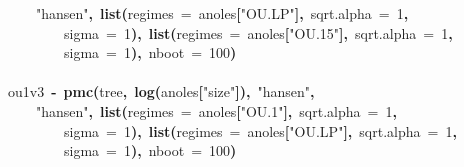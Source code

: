 \documentclass{elsarticle}
\makeatletter
\newcommand{\hlnumber}[1]{\textcolor[rgb]{0,0,0}{#1}}%
\newcommand{\hlfunctioncall}[1]{\textcolor[rgb]{.5,0,.33}{\textbf{#1}}}%
\newcommand{\hlstring}[1]{\textcolor[rgb]{.6,.6,1}{#1}}%
\newcommand{\hlkeyword}[1]{\textbf{#1}}%
\newcommand{\hlargument}[1]{\textcolor[rgb]{.69,.25,.02}{#1}}%
\newcommand{\hlassignement}[1]{\textbf{#1}}%
\newcommand{\hlsymbol}[1]{#1}%
\newcommand{\hlstd}[1]{\textcolor[rgb]{0,0,0}{#1}}%
\newenvironment{kframe}{%
 \def\FrameCommand##1{\hskip\@totalleftmargin \hskip-\fboxsep
 \colorbox{shadecolor}{##1}\hskip-\fboxsep
     \hskip-\linewidth \hskip-\@totalleftmargin \hskip\columnwidth}%
 \MakeFramed {\advance\hsize-\width
   \@totalleftmargin\z@ \linewidth\hsize
   \@setminipage}}%
 {\par\unskip\endMakeFramed}
\newenvironment{knitrout}{}{} %
\makeatother
\begin{document}
\begin{knitrout}
\begin{kframe}
\begin{flushleft}
\hlstd{}{\ }{\ }{\ }{\ }\hlstring{"{}hansen"{}}\hlkeyword{,}{\ }\hlfunctioncall{list}\hlkeyword{(}\hlargument{regimes}{\ }\hlargument{=}{\ }\hlsymbol{anoles}\hlkeyword{[}\hlstring{"{}OU.LP"{}}\hlkeyword{]}\hlkeyword{,}{\ }\hlargument{sqrt.alpha}{\ }\hlargument{=}{\ }\hlnumber{1}\hlkeyword{,}\hspace*{\fill}\\
\hlstd{}{\ }{\ }{\ }{\ }{\ }{\ }{\ }{\ }\hlargument{sigma}{\ }\hlargument{=}{\ }\hlnumber{1}\hlkeyword{)}\hlkeyword{,}{\ }\hlfunctioncall{list}\hlkeyword{(}\hlargument{regimes}{\ }\hlargument{=}{\ }\hlsymbol{anoles}\hlkeyword{[}\hlstring{"{}OU.15"{}}\hlkeyword{]}\hlkeyword{,}{\ }\hlargument{sqrt.alpha}{\ }\hlargument{=}{\ }\hlnumber{1}\hlkeyword{,}\hspace*{\fill}\\
\hlstd{}{\ }{\ }{\ }{\ }{\ }{\ }{\ }{\ }\hlargument{sigma}{\ }\hlargument{=}{\ }\hlnumber{1}\hlkeyword{)}\hlkeyword{,}{\ }\hlargument{nboot}{\ }\hlargument{=}{\ }\hlnumber{100}\hlkeyword{)}\hspace*{\fill}\\
\hlstd{}\hspace*{\fill}\\
\hlstd{}\hlsymbol{ou1v3}{\ }\hlassignement{\usebox{\hlnormalsizeboxlessthan}-}{\ }\hlfunctioncall{pmc}\hlkeyword{(}\hlsymbol{tree}\hlkeyword{,}{\ }\hlfunctioncall{log}\hlkeyword{(}\hlsymbol{anoles}\hlkeyword{[}\hlstring{"{}size"{}}\hlkeyword{]}\hlkeyword{)}\hlkeyword{,}{\ }\hlstring{"{}hansen"{}}\hlkeyword{,}\hspace*{\fill}\\
\hlstd{}{\ }{\ }{\ }{\ }\hlstring{"{}hansen"{}}\hlkeyword{,}{\ }\hlfunctioncall{list}\hlkeyword{(}\hlargument{regimes}{\ }\hlargument{=}{\ }\hlsymbol{anoles}\hlkeyword{[}\hlstring{"{}OU.1"{}}\hlkeyword{]}\hlkeyword{,}{\ }\hlargument{sqrt.alpha}{\ }\hlargument{=}{\ }\hlnumber{1}\hlkeyword{,}\hspace*{\fill}\\
\hlstd{}{\ }{\ }{\ }{\ }{\ }{\ }{\ }{\ }\hlargument{sigma}{\ }\hlargument{=}{\ }\hlnumber{1}\hlkeyword{)}\hlkeyword{,}{\ }\hlfunctioncall{list}\hlkeyword{(}\hlargument{regimes}{\ }\hlargument{=}{\ }\hlsymbol{anoles}\hlkeyword{[}\hlstring{"{}OU.LP"{}}\hlkeyword{]}\hlkeyword{,}{\ }\hlargument{sqrt.alpha}{\ }\hlargument{=}{\ }\hlnumber{1}\hlkeyword{,}\hspace*{\fill}\\
\hlstd{}{\ }{\ }{\ }{\ }{\ }{\ }{\ }{\ }\hlargument{sigma}{\ }\hlargument{=}{\ }\hlnumber{1}\hlkeyword{)}\hlkeyword{,}{\ }\hlargument{nboot}{\ }\hlargument{=}{\ }\hlnumber{100}\hlkeyword{)}\hspace*{\fill}\\

\end{flushleft}
\end{kframe}
\end{knitrout}
\end{document}
